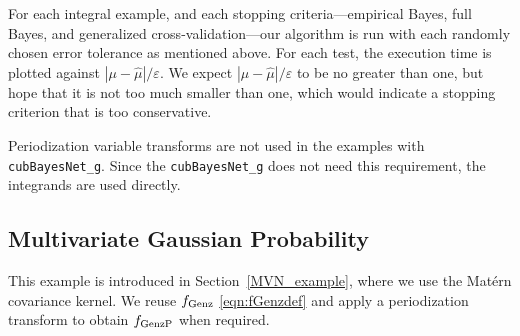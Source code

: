 \documentclass{svjour3}                     %
\newcommand{\hmu}{\widehat{\mu}}
\newcommand{\code}[1]{\texttt{#1}}
\def\abs#1{\ensuremath{\left \lvert #1 \right \rvert}}
\newcommand\secref{Section~\ref}
\begin{document}
For each integral example, and each stopping criteria---empirical Bayes, full Bayes, and generalized cross-validation---our algorithm is run with each randomly chosen error tolerance as mentioned above.  For each test, the execution time is plotted against $\abs{\mu - \hmu}/\varepsilon$.  We expect $\abs{\mu - \hmu}/\varepsilon$ to be no greater than one, but hope that it is not too much smaller than one, which would indicate a stopping criterion that is too conservative.


Periodization variable transforms are not used in the examples with \\ \allowbreak \code{cubBayesNet\_g}. Since the \allowbreak \code{cubBayesNet\_g} does not need this requirement, the integrands are used directly.



\subsection{Multivariate Gaussian Probability}

This example is introduced in Section~\ref{MVN_example}, where we use the Mat\'ern covariance kernel.  We reuse $f_{\textup{Genz}}$ \eqref{eqn:fGenzdef} and apply a periodization transform to obtain $f_{\textup{GenzP}}$ when required.
\end{document}
